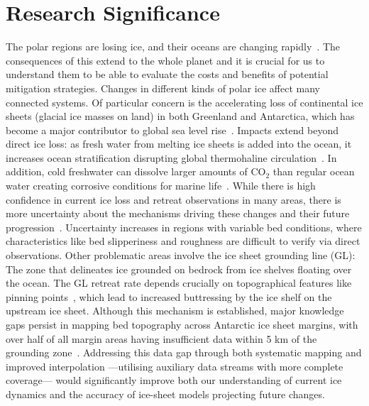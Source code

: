 \chapter{Research Significance}
The polar regions are losing ice, and their oceans are changing rapidly~\cite{O_C_in_changingClimate}. The consequences of this extend to the whole planet and it is crucial for us to understand them to be able to evaluate the costs and benefits of potential mitigation strategies. 
Changes in different kinds of polar ice affect many connected systems. Of particular concern is the accelerating loss of continental ice sheets (glacial ice masses on land) in both Greenland and Antarctica, which has become a major contributor to global sea level rise~\cite{O_C_in_changingClimate}. Impacts extend beyond direct ice loss: as fresh water from melting ice sheets is added into the ocean, it increases ocean stratification disrupting global thermohaline circulation~\cite{Jacobs_2004}. In addition, cold freshwater can dissolve larger amounts of $\mathrm{CO_2}$ than regular ocean water creating corrosive conditions for marine life~\cite{O_C_in_changingClimate}.
While there is high confidence in current ice loss and retreat observations in many areas, there is more uncertainty about the mechanisms driving these changes and their future progression~\cite{Fox-Kemper_2021}. Uncertainty increases in regions with variable bed conditions, where characteristics like bed slipperiness and roughness are difficult to verify via direct observations. Other problematic areas involve the ice sheet grounding line (GL): The zone that delineates ice grounded on bedrock from ice shelves floating over the ocean. The GL retreat rate depends crucially on topographical features like pinning points~\cite{Fox-Kemper_2021}, which lead to increased buttressing by the ice shelf on the upstream ice sheet. Although this mechanism is established, major knowledge gaps persist in mapping bed topography across Antarctic ice sheet margins, with over half of all margin areas having insufficient data within 5 km of the grounding zone~\cite{RINGS_2022}. Addressing this data gap through both systematic mapping and improved interpolation —utilising auxiliary data streams with more complete coverage— would significantly improve both our understanding of current ice dynamics and the accuracy of ice-sheet models projecting future changes.

